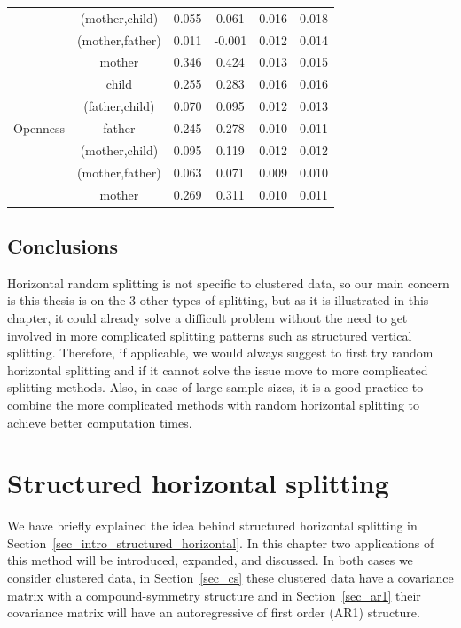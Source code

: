 \documentclass[11pt,a5paper,twoside]{book}
\begin{document}
\begin{table}[ht]
{\begin{tabular}{cccccc}
      &  (mother,child)  & 0.055 & 0.061 & 0.016 & 0.018 \\ 
      &  (mother,father)  & 0.011 & -0.001 & 0.012 & 0.014 \\ 
      &  mother  & 0.346 & 0.424 & 0.013 & 0.015 \\ 
   \hline
  &  child  & 0.255 & 0.283 & 0.016 & 0.016 \\ 
      &  (father,child)  & 0.070 & 0.095 & 0.012 & 0.013 \\ 
    Openness  &  father  & 0.245 & 0.278 & 0.010 & 0.011 \\ 
      &  (mother,child)  & 0.095 & 0.119 & 0.012 & 0.012 \\ 
      &  (mother,father)  & 0.063 & 0.071 & 0.009 & 0.010 \\ 
      &  mother  & 0.269 & 0.311 & 0.010 & 0.011 \\ 
   \hline\hline
\end{tabular}}

\end{table}

\section{Conclusions}

Horizontal random splitting is not specific to clustered data, so our main concern is this thesis is on the 3 other types of splitting, but as it is illustrated in this chapter, it could already solve a difficult problem without the need to get involved in more complicated splitting patterns such as structured vertical splitting. Therefore, if applicable, we would always suggest to first try random horizontal splitting and if it cannot solve the issue move to more complicated splitting methods. Also, in case of large sample sizes, it is a good practice to combine the more complicated methods with random horizontal splitting to achieve better computation times.



\chapter{Structured horizontal splitting}
\label{chap_struc_horiz}

We have briefly explained the idea behind structured horizontal splitting in Section~\ref{sec_intro_structured_horizontal}. In this chapter two applications of this method will be introduced, expanded, and discussed. In both cases we consider clustered data, in Section~\ref{sec_cs} these clustered data have a covariance matrix with a compound-symmetry structure and in Section~\ref{sec_ar1} their covariance matrix will have an autoregressive of first order (AR1) structure.
\end{document}
